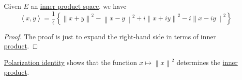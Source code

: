 \begin{lemma}\label{lma:polarization-identity}
	Given \(E\) an \hyperref[def:inner-product-space]{inner product space}, we have
	\[
		\left\langle x, y \right\rangle = \frac{1}{4}\left\{ \left\lVert x+y\right\rVert ^{2} - \left\lVert x-y\right\rVert ^{2} + i \left\lVert x+iy\right\rVert ^{2} - i\left\lVert x-iy\right\rVert ^{2}  \right\}
	\]
\end{lemma}
\begin{proof}
	The proof is just to expand the right-hand side in terms of \hyperref[def:inner-product]{inner product}.
\end{proof}

\begin{remark}
	\hyperref[lma:polarization-identity]{Polarization identity} shows that the function \(x\mapsto \left\lVert x\right\rVert ^{2} \) determines the \hyperref[def:inner-product]{inner product}.
\end{remark}